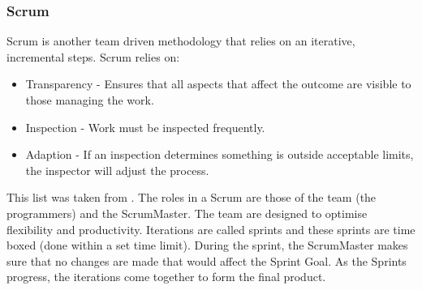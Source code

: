 \documentclass[table,a4paper,oneside]{book}
\begin{document}
\subsubsection{Scrum}
Scrum is another team driven methodology that relies on an iterative, incremental steps. Scrum relies on:
\begin{itemize}
\item Transparency - Ensures that all aspects that affect the outcome are visible to those managing the work.
\item Inspection - Work must be inspected frequently.
\item Adaption - If an inspection determines something is outside acceptable limits, the inspector will adjust the process.
\end{itemize}
This list was taken from \citep{Schwaber2010}. The roles in a Scrum are those of the team (the programmers) and the ScrumMaster. The team are designed to optimise flexibility and productivity. Iterations are called sprints and these sprints are time boxed (done within a set time limit). During the sprint, the ScrumMaster makes sure that no changes are made that would affect the Sprint Goal. As the Sprints progress, the iterations come together to form the final product.




\end{document}
